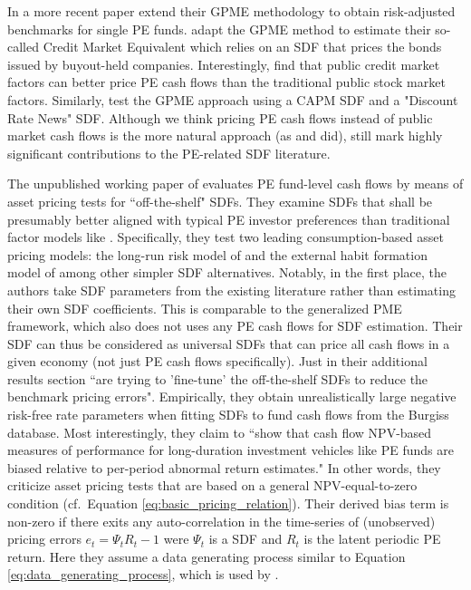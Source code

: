 \documentclass[12pt]{article}
\begin{document}
In a more recent paper \cite{KN22} extend their GPME methodology to obtain risk-adjusted benchmarks for single PE funds.
\cite{NSS22} adapt the GPME method to estimate their so-called Credit Market Equivalent which relies on an SDF that prices the bonds issued by buyout-held companies.
Interestingly, \cite{NSS22} find that public credit market factors can better price PE cash flows than the traditional public stock market factors.
Similarly, \cite{GJ21} test the GPME approach using a CAPM SDF and a "Discount Rate News" SDF.
Although we think pricing PE cash flows instead of public market cash flows is the more natural approach (as \cite{GJ21} and \cite{NSS22} did), \cite{KN16,KN22} still mark highly significant contributions to the PE-related SDF literature.

The unpublished working paper of \cite{GSW19} evaluates PE fund-level cash flows by means of asset pricing tests for ``off-the-shelf" SDFs.
They examine SDFs that shall be presumably better aligned with typical PE investor preferences than traditional factor models like \cite{FF15}.
Specifically, they test two leading consumption-based asset pricing models: the long-run risk model of \cite{BY04} and the external habit formation model of \cite{CC99} among other simpler SDF alternatives.
Notably, in the first place, the authors take SDF parameters from the existing literature rather than estimating their own SDF coefficients.
This is comparable to the \cite{KN16} generalized PME framework, which also does not uses any PE cash flows for SDF estimation.
Their SDF can thus be considered as universal SDFs that can price all cash flows in a given economy (not just PE cash flows specifically).
Just in their additional results section \cite{GSW19} ``are trying to 'fine-tune' the off-the-shelf SDFs to reduce the benchmark pricing errors".
Empirically, they obtain unrealistically large negative risk-free rate parameters when fitting SDFs to fund cash flows from the Burgiss database.
Most interestingly, they claim to ``show that cash flow NPV-based measures of performance for long-duration investment vehicles like PE funds are biased relative to per-period abnormal return estimates."
In other words, they criticize asset pricing tests that are based on a general NPV-equal-to-zero condition (cf.\ Equation \ref{eq:basic_pricing_relation}).
Their derived bias term is non-zero if there exits any auto-correlation in the time-series of (unobserved) pricing errors $e_t = \Psi_t R_t - 1$ were $\Psi_t$ is a SDF and $R_t$ is the latent periodic PE return.
Here they assume a data generating process similar to Equation \ref{eq:data_generating_process}, which is used by \cite{ACGP18}.
\end{document}
